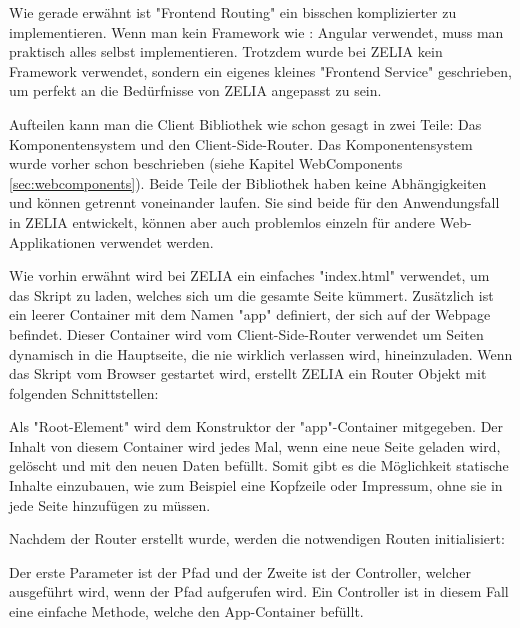 
Wie gerade erwähnt ist "Frontend Routing" ein bisschen komplizierter zu implementieren. Wenn man kein Framework wie \zb: Angular verwendet, muss man praktisch alles selbst implementieren. Trotzdem wurde bei ZELIA kein Framework verwendet, sondern  ein eigenes kleines "Frontend Service" geschrieben, um perfekt an die Bedürfnisse von ZELIA angepasst zu sein.

Aufteilen kann man die Client Bibliothek wie schon gesagt in zwei Teile: Das Komponentensystem und den Client-Side-Router. Das Komponentensystem wurde vorher schon beschrieben (siehe Kapitel WebComponents \ref{sec:webcomponents}). Beide Teile der Bibliothek haben keine Abhängigkeiten und können getrennt voneinander laufen. Sie sind beide für den Anwendungsfall in ZELIA entwickelt, können aber auch problemlos einzeln für andere Web-Applikationen verwendet werden.

Wie vorhin erwähnt wird bei ZELIA ein einfaches "index.html" verwendet, um das Skript zu laden, welches sich um die gesamte Seite kümmert. Zusätzlich ist ein leerer Container mit dem Namen "app" definiert, der sich auf der Webpage befindet. Dieser Container wird vom Client-Side-Router verwendet um Seiten dynamisch in die Hauptseite, die nie wirklich verlassen wird, hineinzuladen. Wenn das Skript vom Browser gestartet wird, erstellt ZELIA ein Router Objekt mit folgenden Schnittstellen:


Als "Root-Element" wird dem Konstruktor der "app"-Container mitgegeben. Der Inhalt von diesem Container wird jedes Mal, wenn eine neue Seite geladen wird, gelöscht und mit den neuen Daten befüllt. Somit gibt es die Möglichkeit statische Inhalte einzubauen, wie zum Beispiel eine Kopfzeile oder Impressum, ohne sie in jede Seite hinzufügen zu müssen.

Nachdem der Router erstellt wurde, werden die notwendigen Routen initialisiert:



Der erste Parameter ist der Pfad und der Zweite ist der Controller, welcher ausgeführt wird, wenn der Pfad aufgerufen wird. Ein Controller ist in diesem Fall eine einfache Methode, welche den App-Container befüllt.


